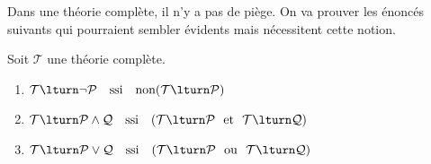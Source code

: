 \documentclass[11pt,class=report,crop=false]{standalone}
\begin{document}
Dans une théorie complète, il n'y a pas de piège. On va prouver les énoncés suivants qui pourraient sembler évidents mais nécessitent cette notion.

\begin{lemme}
	\label{lem:compbis}
	Soit $\mathcal{T}$ une théorie complète. 
	\begin{enumerate}
		\item $\mathcal{T} \lturn \lnot \mathcal{P} \quad \text{ssi} \quad \text{non}(\mathcal{T} \lturn \mathcal{P})$
		\item $\mathcal{T} \lturn \mathcal{P} \land \mathcal{Q} \quad \text{ssi} \quad (\mathcal{T} \lturn \mathcal{P} \ \text{ et } \ \mathcal{T} \lturn \mathcal{Q})$
		\item $\mathcal{T} \lturn \mathcal{P} \lor \mathcal{Q} \quad \text{ssi} \quad (\mathcal{T} \lturn \mathcal{P} \ \text{ ou } \ \mathcal{T} \lturn \mathcal{Q})$
	\end{enumerate}
\end{lemme}
\end{document}
